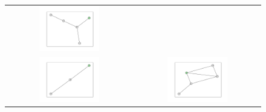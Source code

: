 \documentclass[12pt, a4paper]{extarticle}
\begin{document}
\begin{figure}
\begin{tabularx}{\textwidth}{cc}
\includegraphics[width=0.5\textwidth]{task11-graphlets/5_14-21-19-22-23.pdf} \\
\includegraphics[width=0.5\textwidth]{task11-graphlets/3_16-18-23.pdf} &
\includegraphics[width=0.5\textwidth]{task11-graphlets/5_14-21-25-23-24.pdf} \\
\end{tabularx}\end{figure}
\end{document}

